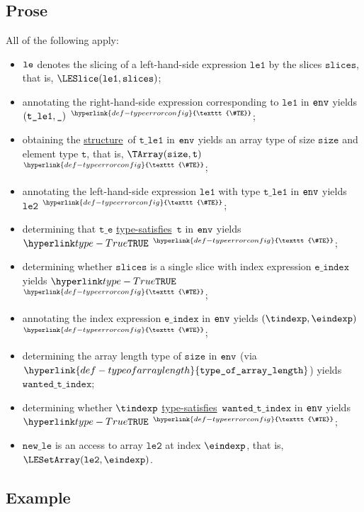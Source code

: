 \documentclass{book}
\newcommand\TypeErrorConfig[0]{\hyperlink{def-typeerrorconfig}{\texttt{\#TE}}}
\newcommand\ProseOrTypeError[0]{\hyperlink{def-proseortypeerror}{$^{\TypeErrorConfig}$}}
\newcommand\structure[0]{\hyperlink{def-structure}{structure}}
\newcommand\typesatisfies[0]{\hyperlink{def-typesatisfies}{type-satisfies}}
\newcommand\typeofarraylength[0]{\hyperlink{def-typeofarraylength}{\texttt{type\_of\_array\_length}}}
\newcommand\vt[0]{\texttt{t}}
\newcommand\vte[0]{\texttt{t\_e}}
\newcommand\vleone[0]{\texttt{le1}}
\newcommand\vletwo[0]{\texttt{le2}}
\newcommand\vtleone[0]{\texttt{t\_le1}}
\newcommand\size[0]{\texttt{size}}
\newcommand\newle[0]{\texttt{new\_le}}
\newcommand\eindex[0]{\texttt{e\_index}}
\newcommand\wantedtindex[0]{\texttt{wanted\_t\_index}}
\newcommand\slices[0]{\texttt{slices}}
\begin{document}
\subsection{Prose}
All of the following apply:
\begin{itemize}
  \item $\texttt{le}$ denotes the slicing of a left-hand-side expression $\vleone$ by the slices $\slices$, that is, $\LESlice(\vleone, \slices)$;
  \item annotating the right-hand-side expression corresponding to $\vleone$ in $\texttt{env}$ yields \\ $(\vtleone, \Ignore)$ \ProseOrTypeError;
  \item obtaining the \structure\ of $\vtleone$ in $\texttt{env}$ yields an array type of size $\size$ and element type $\vt$, that is, $\TArray(\size, \vt)$ \ProseOrTypeError;
  \item annotating the left-hand-side expression $\vleone$ with type $\vtleone$ in $\texttt{env}$ yields $\vletwo$ \ProseOrTypeError;
  \item determining that $\vte$ \typesatisfies\ $\vt$ in $\texttt{env}$ yields $\True$ \ProseOrTypeError;
  \item determining whether $\slices$ is a single slice with index expression $\eindex$ yields $\True$ \ProseOrTypeError;
  \item annotating the index expression $\eindex$ in $\texttt{env}$ yields $(\tindexp, \eindexp)$ \ProseOrTypeError;
  \item determining the array length type of $\size$ in $\texttt{env}$ (via $\typeofarraylength$) yields $\wantedtindex$;
  \item determining whether $\tindexp$ \typesatisfies\ $\wantedtindex$ in $\texttt{env}$ yields $\True$ \ProseOrTypeError;
  \item $\newle$ is an access to array $\vletwo$ at index $\eindexp$, that is, \\ $\LESetArray(\vletwo, \eindexp)$.
\end{itemize}

\subsection{Example}

\end{document}
